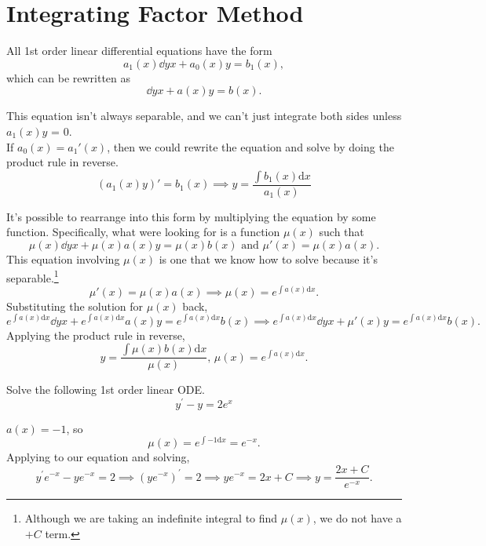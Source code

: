 \section{Integrating Factor Method}
All 1st order linear differential equations have the form
\begin{equation*}
	a_1(x)\dd{y}{x} + a_0(x)y = b_1(x),
\end{equation*}
which can be rewritten as
\begin{equation*}
	\dd{y}{x} + a(x)y = b(x).
\end{equation*}

\noindent
This equation isn't always separable, and we can't just integrate both sides unless $a_1(x)y$ = 0.\\

\noindent
If $a_0(x) = a_1'(x)$, then we could rewrite the equation and solve by doing the product rule in reverse.
\begin{equation*}
	\left(a_1(x)y\right)' = b_1(x) \implies y = \frac{\int{b_1(x) \mathrm{d}x}}{a_1(x)}
\end{equation*}

\noindent
It's possible to rearrange into this form by multiplying the equation by some function. Specifically, what were looking for is a function $\mu(x)$ such that
\begin{equation*}
	\mu(x)\dd{y}{x} + \mu(x)a(x)y = \mu(x)b(x) \text{ and } \mu'(x) = \mu(x)a(x).
\end{equation*}
This equation involving $\mu(x)$ is one that we know how to solve because it's separable.\footnote{Although we are taking an indefinite integral to find $\mu(x)$, we do not have a $+ C$ term.}
\begin{equation*}
	\mu'(x) = \mu(x)a(x) \implies \mu(x) = e^{\int{a(x) \mathrm{d}x}}.
\end{equation*}
Substituting the solution for $\mu(x)$ back,
\begin{equation*}
	e^{\int{a(x) \mathrm{d}x}}\dd{y}{x} + e^{\int{a(x) \mathrm{d}x}}a(x)y = e^{\int{a(x) \mathrm{d}x}}b(x) \implies e^{\int{a(x) \mathrm{d}x}}\dd{y}{x} + \mu'(x)y = e^{\int{a(x) \mathrm{d}x}}b(x).
\end{equation*}
Applying the product rule in reverse,
\begin{equation*}
	y = \frac{\int{\mu(x)} b(x) \mathrm{d}x}{\mu(x)} \text{, } \mu(x) = e^{\int{a(x) \mathrm{d}x}}.
\end{equation*}

\begin{example}
	Solve the following 1st order linear ODE.
	\begin{equation*}
		y^\prime - y = 2e^{x}
	\end{equation*}
\end{example}
\noindent
$a(x) = -1$, so
\begin{equation*}
	\mu(x) = e^{\int{-1 \mathrm{d}x}} = e^{-x}.
\end{equation*}
Applying to our equation and solving,
\begin{equation*}
	y^\prime e^{-x} - ye^{-x} = 2 \implies \left(ye^{-x}\right)^\prime = 2 \implies ye^{-x} = 2x + C \implies y = \frac{2x + C}{e^{-x}}.
\end{equation*}